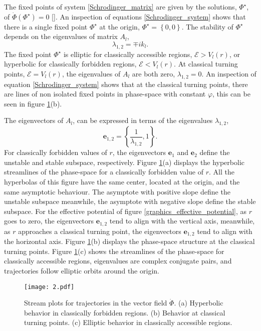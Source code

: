 \documentclass[%
 aip,
 numerical,
 jcp,
 floatfix,
rsi,%
amsmath,amssymb,
reprint,%
author-year%
]{revtex4-1}
\begin{document}
The fixed points of system \eqref{Schrodinger_matrix} are given by the solutions, $\Phi^\star$, of $\dot{\Phi}(\Phi^\star)=0$ []. An inspection of equations \eqref{Schrodinger_system} shows that there is a single fixed point $\Phi^\star$ at the origin,  $\Phi^\star=\left\{0,0\right\}$. The stability of $\Phi^\star$ depends on the eigenvalues of matrix $A_{l}$, \begin{equation}\label{eigenvalues}
\lambda_{1,2}=\mp i k_l.     
\end{equation}
The fixed point $\Phi^\star$ is elliptic for classically accessible regions, $\mathcal{E}>V_l(r)$, or  hyperbolic for classically forbidden regions, $\mathcal{E}<V_l(r)$. At classical turning points, $\mathcal{E}=V_l(r)$, the eigenvalues of $A_l$ are both zero, $\lambda_{1,2}=0$. An inspection of equation \eqref{Schrodinger_system} shows that at the classical turning points, there are lines of non isolated fixed points in phase-space with constant $\varphi$, this can be seen in figure \ref{streamplots}(b). 

The eigenvectors of $A_l$, can be expressed in terms of the eigenvalues $\lambda_{1,2}$, 
\begin{equation}\label{eigenvectors}
  \textbf{e}_{1,2}=\left\{\frac{1}{\lambda_{1,2}}, 1\right\}.  
\end{equation}
For classically forbidden values of $r$, the eigenvectors $\textbf{e}_1$ and $\textbf{e}_2$ define the unstable and stable subspace, respectively. Figure \ref{streamplots}(a) displays the hyperbolic streamlines of the phase-space for a classically forbidden value of $r$. All the hyperbolas of this figure have the same center, located at the origin, and the same asymptotic behaviour. The asymptote with positive slope define the unstable subspace meanwhile, the asymptote with negative slope define the stable subspace. For the effective potential of figure \ref{graphics_effective_potential}, as $r$ goes to zero, the eigenvectors $\textbf{e}_{1,2}$ tend to align with the vertical axis, meanwhile, as $r$ approaches a classical turning point, the eigenvectors $\textbf{e}_{1,2}$ tend to align with the horizontal axis. Figure \ref{streamplots}(b) displays the phase-space structure at the classical turning points. Figure \ref{streamplots}(c) shows the streamlines of the phase-space for classically accessible regions, eigenvalues are complex conjugate pairs, and trajectories follow elliptic orbits around the origin.

\begin{figure}[htp]
\texttt{[image: 2.pdf]}\centering
\caption{Stream plots for trajectories in the vector field $\dot\Phi$. (a) Hyperbolic behavior in classically forbidden regions. (b) Behavior at classical turning points. (c) Elliptic behavior in classically accessible regions.}\label{streamplots}
\end{figure}
\end{document}
